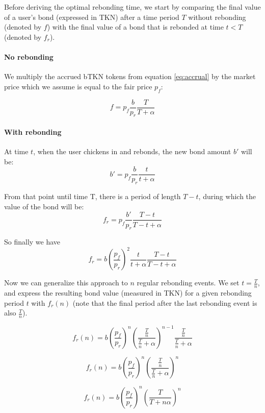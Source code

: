 \documentclass{article}
\begin{document}
Before deriving the optimal rebonding time, we start by comparing the final value of a user's bond (expressed in TKN) after a time period $T$ without rebonding (denoted by $f$) with the final value of a bond that is rebonded at time $t<T$ (denoted by $f_r$).

\paragraph{No rebonding}
We multiply the accrued bTKN tokens from equation \ref{eq:accrual} by the market price which we assume is equal to the fair price $p_f$:

\begin{equation}
  \label{eq:o-s}
f = p_f\frac{b}{p_r}\frac{T}{T+\alpha}
\end{equation}

\paragraph{With rebonding}
At time $t$, when the user chickens in and rebonds, the new bond amount $b'$ will be:
\begin{equation}
b'= p_f\frac{b}{p_r}\frac{t}{t+\alpha}
\end{equation}

From that point until time T, there is a period of length $T-t$, during which the value of the bond will be:
\begin{equation}
f_r = p_f\frac{b'}{p_r}\frac{T-t}{T-t+\alpha}
\end{equation}

So finally we have
\begin{equation}
  \label{eq:o-r}
f_r = b\left(\frac{p_f}{p_r}\right)^2\frac{t}{t+\alpha}\frac{T-t}{T-t+\alpha}
\end{equation}

Now we can generalize this approach to $n$ regular rebonding events. We set $t=\frac{T}{n}$, and express the resulting bond value (measured in TKN) for a given rebonding period $t$ with $f_r(n)$ (note that the final period after the last rebonding event is also $\frac{T}{n}$).

\[
f_r(n) = b \left(\frac{p_f}{p_r}\right)^n \left(\frac{\frac{T}{n}}{\frac{T}{n}+\alpha}\right)^{n-1} \frac{\frac{T}{n}}{\frac{T}{n}+\alpha}
\]

\[
f_r(n) = b \left(\frac{p_f}{p_r}\right)^n \left(\frac{\frac{T}{n}}{\frac{T}{n}+\alpha}\right)^{n}
\]

\[
f_r(n) = b \left(\frac{p_f}{p_r}\right)^n \left(\frac{T}{T + n\alpha}\right)^{n}
\]
\end{document}
